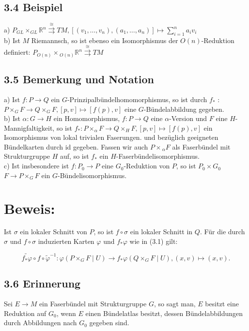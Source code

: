 \documentclass[10pt, letterpaper]{article}
\begin{document}
\subsection*{3.4 Beispiel}
a) $P_{G L} \times_{G L} \mathbb{R}^{n} \stackrel{\cong}{\rightrightarrows} T M,\left[\left(v_{1}, \ldots, v_{n}\right),\left(a_{1}, \ldots, a_{n}\right)\right] \mapsto \sum_{i=1}^{n} a_{i} v_{i}$\\
b) Ist $M$ Riemannsch, so ist ebenso ein Isomorphismus der $O(n)$-Reduktion definiert: $P_{O(n)} \times{ }_{O(n)} \mathbb{R}^{n} \stackrel{\cong}{\rightrightarrows} T M$

\subsection*{3.5 Bemerkung und Notation}
a) Ist $f: P \rightarrow Q$ ein $G$-Prinzipalbündelhomomorphismus, so ist durch $f_{*}$ : $P \times_{G} F \rightarrow Q \times_{G} F,[p, v] \mapsto[f(p), v]$ eine $G$-Bündelabbildung gegeben.\\
b) Ist $\alpha: G \rightarrow H$ ein Homomorphismus, $f: P \rightarrow Q$ eine $\alpha$-Version und $F$ eine $H$-Mannigfaltigkeit, so ist $f_{*}: P \times_{\alpha} F \rightarrow Q \times_{H} F,[p, v] \mapsto[f(p), v]$ ein Isomorphismus von lokal trivialen Faserungen. und bezüglich geeigneten Bündelkarten durch id gegeben. Fassen wir auch $P \times{ }_{\alpha} F$ als Faserbündel mit Strukturgruppe $H$ auf, so ist $f_{*}$ ein $H$-Faserbündelisomorphismus.\\
c) Ist insbesondere ist $f: P_{0} \rightarrow P$ eine $G_{0}$-Reduktion von $P$, so ist $P_{0} \times G_{0}$ $F \rightarrow P \times_{G} F$ ein $G$-Bündelisomorphismus.

\section*{Beweis:}
Ist $\sigma$ ein lokaler Schnitt von $P$, so ist $f \circ \sigma$ ein lokaler Schnitt in $Q$. Für die durch $\sigma$ und $f \circ \sigma$ induzierten Karten $\varphi$ und $f_{*} \varphi$ wie in (3.1) gilt:

$$
\widetilde{f_{*} \varphi} \circ f \circ \tilde{\varphi}^{-1}: \varphi\left(P \times_{G} F \mid U\right) \rightarrow f_{*} \varphi\left(Q \times_{G} F \mid U\right),(x, v) \mapsto(x, v) .
$$

\subsection*{3.6 Erinnerung}
Sei $E \rightarrow M$ ein Faserbündel mit Strukturgruppe $G$, so sagt man, $E$ besitzt eine Reduktion auf $G_{0}$, wenn $E$ einen Bündelatlas besitzt, dessen Bündelabbildungen durch Abbildungen nach $G_{0}$ gegeben sind.
\end{document}
